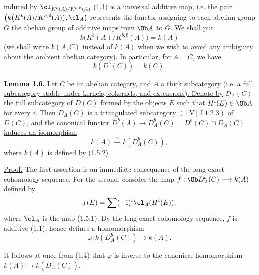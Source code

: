%
induced by \(\cl_{K^b(A)/K^{b,\emptyset}(A)}\) (1.1) is a universal additive map, i.e. the pair \(\left(k\bigl(K^b(A)/K^{b,\emptyset}(A)\bigr),\cl_A\right)\) represents the functor assigning to each abelian group \(G\) the abelian group of additive maps from \(\Ob A\) to \(G\). We shall put
\begin{equation}\tag{1.5.2}
 k\bigl(K^b(A)/K^{b,\emptyset}(A)\bigr)=k(A)
\end{equation}
(we shall write \(k(A,C)\) instead of \(k(A)\) when we wish to avoid any ambiguity about the ambient abelian category).
In particular, for \(A=C\), we have
\begin{equation}\tag{1.5.3}
 k(D^b(C))=k(C).
\end{equation}

\textbf{Lemma 1.6.} \uline{Let} \(C\) \uline{be an abelian category, and} \(A\) \uline{a thick subcategory (i.e. a full subcategory stable under kernels, cokernels, and extensions). Denote by} \(D_A(C)\) \uline{the full subcategory of} \(D(C)\) \uline{formed by the objects} \(E\) \uline{such that} \(H^i(E)\in\Ob A\) \uline{for every} \(i\)\uline{. Then} \(D_A(C)\) \uline{is a triangulated subcategory} \(([\mathrm V]\ \mathrm I\ 1.2.3)\) \uline{of} \(D(C)\)\uline{, and the canonical functor} \(D^b(A)\longrightarrow D_A^b(C)=D^b(C)\cap D_A(C)\) \uline{induces an isomorphism}
\[
 k(A)\xrightarrow{\sim} k(D_A^b(C)),
\]
\uline{where} \(k(A)\) \uline{is defined by} (1.5.2).

\uline{Proof.} The first assertion is an immediate consequence of the long exact cohomology sequence. For the second, consider the map \(f:\Ob D_A^b(C)\longrightarrow k(A)\) defined by
\[
 f(E)=\sum(-1)^i\cl_A(H^i(E)),
\]
where \(\cl_A\) is the map (1.5.1). By the long exact cohomology sequence, \(f\) is additive (1.1), hence defines a homomorphism
\[
 \varphi:k(D_A^b(C))\longrightarrow k(A).
\]

%
It follows at once from (1.4) that \(\varphi\) is inverse to the canonical homomorphism \(k(A)\longrightarrow k(D_A^b(C))\).

